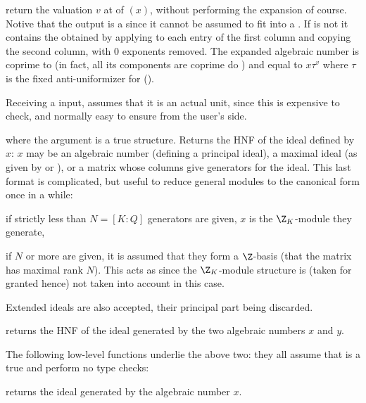  return the
valuation $v$ at  of $(x)$, without performing the
expansion of course. Notive that the output is a  since it cannot be
assumed to fit into a . If  is not  it contains
the  obtained by applying  to each entry of the
first column and copying the second column, with $0$ exponents removed. The
expanded algebraic number is coprime to  (in fact, all its components
are coprime do ) and equal to $x \tau^v$ where $\tau$ is the fixed
anti-uniformizer for  ().

 Receiving a  input,  assumes that
it is an actual unit, since this is expensive to check, and normally
easy to ensure from the user's side.



 where the argument  is a true
 structure. Returns the HNF of the ideal defined by $x$:
$x$ may be an algebraic  number (defining a principal ideal),  a maximal ideal
(as given by  or  ), or a matrix whose
columns give generators for the  ideal. This  last format is complicated,  but
useful to reduce general modules to the canonical form once in a while:

\item if strictly less than $N = [K:Q]$ generators are given,  $x$ is the
$\Z_K$-module they generate,

\item if $N$ or more are given,  it is assumed that they form a $\Z$-basis
(that the matrix has maximal rank $N$).  This acts as  since the
$\Z_K$-module structure is (taken for granted hence) not taken into account
in this case.

Extended ideals are also accepted, their principal part being discarded.

 returns the HNF of the ideal
generated by the two algebraic numbers $x$ and $y$.

The following low-level functions underlie the above two: they all assume
that  is a true  and perform no type checks:

returns the ideal generated by the algebraic number $x$.

